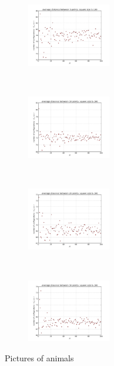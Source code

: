 \documentclass[a4paper,10pt]{article}
\begin{document}
\begin{figure}
        \centering
        \begin{subfigure}[b]{0.3\textwidth}
		\centering
		\includegraphics[width=0.4\textwidth]{solR1n5}
        \end{subfigure}%
        ~ %
        \begin{subfigure}[b]{0.3\textwidth}
		\centering
		\includegraphics[width=0.4\textwidth]{solR1n10}
        \end{subfigure}%
        ~ %
        \begin{subfigure}[b]{0.3\textwidth}
		\centering
		\includegraphics[width=0.4\textwidth]{solR1n20}
        \end{subfigure}
        ~ %
        \begin{subfigure}[b]{0.3\textwidth}
		\centering
		\includegraphics[width=0.4\textwidth]{solR1n30}
		\caption{}
		\label{fig5}
        \end{subfigure}
        \caption{Pictures of animals}
        \label{fig:animals}
\end{figure}
\end{document}

